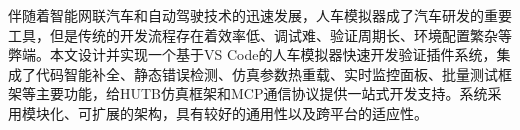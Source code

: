 \begin{abstractzh}

伴随着智能网联汽车和自动驾驶技术的迅速发展，人车模拟器成了汽车研发的重要工具，但是传统的开发流程存在着效率低、调试难、验证周期长、环境配置繁杂等弊端。本文设计并实现一个基于VS Code的人车模拟器快速开发验证插件系统，集成了代码智能补全、静态错误检测、仿真参数热重载、实时监控面板、批量测试框架等主要功能，给HUTB仿真框架和MCP通信协议提供一站式开发支持。系统采用模块化、可扩展的架构，具有较好的通用性以及跨平台的适应性。

\end{abstractzh}
